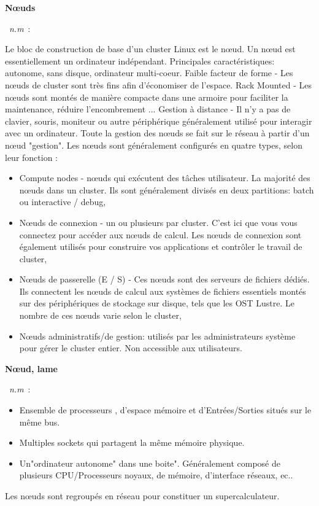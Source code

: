 \documentclass[10pt,a4paper,twoside]{article} %
\newcommand{\entry}[3]{\textbf{#1}\markboth{#1}{#1}\  \textit{#2}\ :  {#3}} %
\begin{document}
\begin{multicols}{2}

\entry{Nœuds}{n.m}{Le bloc de construction de base d'un cluster Linux est le nœud. Un nœud est essentiellement un ordinateur indépendant. Principales caractéristiques: autonome, sans disque, ordinateur multi-coeur. Faible facteur de forme - Les nœuds de cluster sont très fins afin d'économiser de l'espace. Rack Mounted - Les nœuds sont montés de manière compacte dans une armoire pour faciliter la maintenance, réduire l'encombrement ... Gestion à distance - Il n'y a pas de clavier, souris, moniteur ou autre périphérique généralement utilisé pour interagir avec un ordinateur. Toute la gestion des nœuds se fait sur le réseau à partir d'un nœud "gestion".
Les nœuds sont généralement configurés en quatre types, selon leur fonction :
\begin{itemize}
  \item Compute nodes - nœuds qui exécutent des tâches utilisateur. La majorité des nœuds dans un cluster. Ils sont généralement divisés en deux partitions: batch ou interactive / debug, 
  \item Nœuds de connexion - un ou plusieurs par cluster. C'est ici que vous vous connectez pour accéder aux nœuds de calcul. Les nœuds de connexion sont également utilisés pour construire vos applications et contrôler le travail de cluster,
  \item Nœuds de passerelle (E / S) - Ces nœuds sont des serveurs de fichiers dédiés. Ils connectent les nœuds de calcul aux systèmes de fichiers essentiels montés sur des périphériques de stockage sur disque, tels que les OST Lustre. Le nombre de ces nœuds varie selon le cluster,
  \item Nœuds administratifs/de gestion: utilisés par les administrateurs système pour gérer le cluster entier. Non accessible aux utilisateurs.
\end{itemize}}

\entry{Nœud, lame}{n.m}{\begin{itemize}
  \item Ensemble de processeurs , d'espace mémoire et d'Entrées/Sorties situés sur le même bus.
  \item Multiples sockets qui partagent la même mémoire physique.
  \item Un"ordinateur autonome" dans une boite". Généralement composé de plusieurs CPU/Processeurs noyaux, de mémoire, d'interface réseaux, ec.. 
\end{itemize} Les nœuds sont regroupés en réseau pour constituer un supercalculateur.}


\end{multicols}
\end{document}
